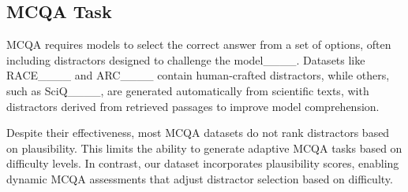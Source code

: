 \subsection{MCQA Task}
MCQA requires models to select the correct answer from a set of options, often including distractors designed to challenge the model____. Datasets like RACE____ and ARC____ contain human-crafted distractors, while others, such as SciQ____, are generated automatically from scientific texts, with distractors derived from retrieved passages to improve model comprehension.

Despite their effectiveness, most MCQA datasets do not rank distractors based on plausibility. This limits the ability to generate adaptive MCQA tasks based on difficulty levels. In contrast, our dataset incorporates plausibility scores, enabling dynamic MCQA assessments that adjust distractor selection based 
on difficulty.


